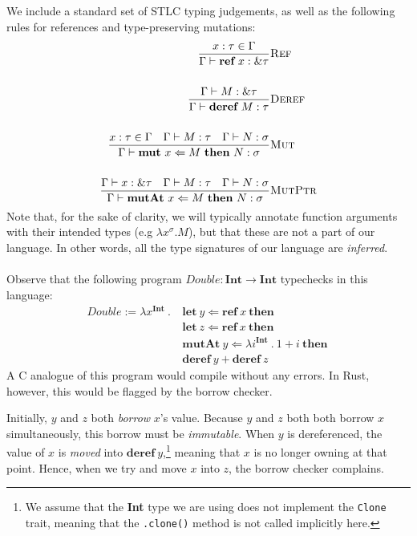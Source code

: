 \documentclass{article}
\newcommand{\mkref}{\textbf{ref}~}
\newcommand{\deref}{\textbf{deref}~}%
\newcommand{\mutate}[3]{\textbf{mut}~ #1 \Leftarrow #2 ~\textbf{then}~ #3}
\newcommand{\mutptr}[3]{\textbf{mutAt}~ #1 \Leftarrow #2 ~\textbf{then}~ #3}
\newcommand{\letvar}[3]{\textbf{let}~ #1 \Leftarrow #2 ~\textbf{then}~ #3}
\begin{document}
We include a standard set of STLC typing judgements, as well as the following rules for references and type-preserving mutations:
\begin{align*}
    \frac{x : \tau \in \Gamma}{\Gamma \vdash \mkref x : \& \tau}&\textsc{Ref}\\
    ~\\
    \frac{\Gamma \vdash M : \& \tau}{\Gamma \vdash \deref M : \tau}&\textsc{Deref}\\
    ~\\
    \frac{x : \tau \in \Gamma \hspace{1em} \Gamma \vdash M : \tau \hspace{1em} \Gamma \vdash N : \sigma }{\Gamma \vdash \mutate{x}{M}{N} : \sigma}&\textsc{Mut}\\
    ~\\
    \frac{ \Gamma \vdash x : \& \tau \hspace{1em} \Gamma \vdash M : \tau \hspace{1em} \Gamma \vdash N : \sigma }{\Gamma \vdash \mutptr{x}{M}{N} : \sigma }&\textsc{MutPtr}
\end{align*}
Note that, for the sake of clarity, we will typically annotate function arguments with their intended types (e.g $\lambda x^\sigma . M$), but that these are not a part of our language. In other words, all the type signatures of our language are \textit{inferred}.
\\~\\
Observe that the following program $Double : \textbf{Int} \rightarrow \textbf{Int}$ typechecks in this language:
\begin{align*}
    Double := \lambda x^{\textbf{Int}} ~.~ &\letvar{y}{\mkref x}{}\\  %
    &\letvar{z}{\mkref x}{}\\
    & \mutptr{y}{ \lambda i^{\textbf{Int}} ~.~ 1 + i }{} \\
    &\deref y + \deref z
\end{align*}
A C analogue of this program would compile without any errors. In Rust, however, this would be flagged by the borrow checker. 

Initially, $y$ and $z$ both \textit{borrow} $x$'s value. Because $y$ and $z$ both both borrow $x$ simultaneously, this borrow must be \textit{immutable}.  When $y$ is dereferenced, the value of $x$ is \textit{moved} into $\deref y$,\footnote{We assume that the \textbf{Int} type we are using does not implement the \texttt{Clone} trait, meaning that the \texttt{.clone()} method is not called implicitly here.} meaning that $x$ is no longer owning at that point. Hence, when we try and move $x$ into $z$, the borrow checker complains. 
\end{document}

